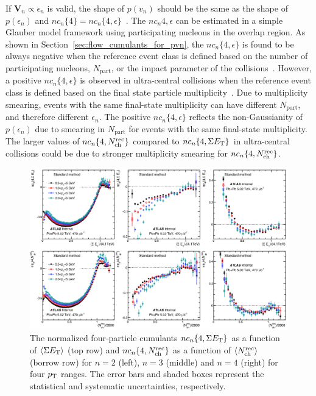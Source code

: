 If $\pmb{V}_n \propto \epsilon_n$ is valid, the shape of $p(v_n)$ should be the same as the shape of $p(\epsilon_n)$ and $nc_n\{4\}=nc_n\{4, \epsilon\}$~\cite{Giacalone:2017uqx, Zhou:2018fxx}. The $nc_n{4, \epsilon}$ can be estimated in a simple Glauber model framework using participating nucleons in the overlap region. As shown in Section~\ref{sec:flow_cumulants_for_pvn}, the $nc_n\{4, \epsilon\}$ is found to be always negative when the reference event class is defined based on the number of participating nucleons, $N_\text{part}$, or the impact parameter of the collisions~\cite{Alver:2008zza}. However, a positive $nc_n\{4, \epsilon\}$ is observed in ultra-central collisions when the reference event class is defined based on the final state particle multiplicity~\cite{Zhou:2018fxx, Agakishiev:2011eq}. Due to multiplicity smearing, events with the same final-state multiplicity can have different $N_\text{part}$, and therefore different $\epsilon_n$. The positive $nc_n\{4, \epsilon\}$ reflects the non-Gaussianity of $p(\epsilon_n)$ due to smearing in $N_\text{part}$ for events with the same final-state multiplicity. The larger values of $nc_n\{4, N_\text{ch}^\text{rec}\}$ compared to $nc_n\{4, \Sigma E_\text{T}\}$ in ultra-central collisions could be due to stronger multiplicity smearing for $nc_n\{4, N_\text{ch}^\text{rec}\}$.

\begin{figure}[H]
\centering
\includegraphics[width=.95\linewidth]{figs/chapter_centfluc/ATLAS_nc_4pc_cf1.png}
\caption{The normalized four-particle cumulants $nc_n\{4, \Sigma E_\text{T}\}$ as a function of $\left\langle \Sigma E_\text{T}\right\rangle$ (top row) and $nc_n\{4, N_\text{ch}^\text{rec}\}$ as a function of $\left\langle N_\text{ch}^\text{rec}\right\rangle$ (borrow row) for $n=2$ (left), $n=3$ (middle) and $n=4$ (right) for four $p_\text{T}$ ranges. The error bars and shaded boxes represent the statistical and systematic uncertainties, respectively.}
\label{fig:centfluc_ATLAS_nc_4pc_cf1}
\end{figure}

